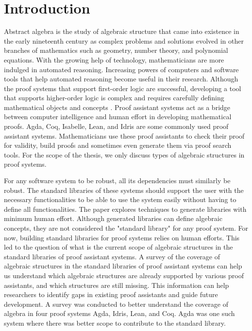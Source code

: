 \chapter{Introduction}
Abstract algebra is the study of algebraic structure that came into existence in
the early nineteenth century as complex problems and solutions evolved in other
branches of mathematics such as geometry, number theory, and polynomial
equations. With the growing help of technology, mathematicians are more indulged
in automated reasoning. Increasing powers of computers and software tools that
help automated reasoning become useful in their research. Although the
proof systems that support first-order logic are successful, developing a tool
that supports higher-order logic is complex and requires carefully defining
mathematical objects and concepts \cite{phillips2010automated}. Proof assistant
systems act as a bridge between computer intelligence and human effort in
developing mathematical proofs. Agda, Coq, Isabelle, Lean, and Idris are some
commonly used proof assistant systems. Mathematicians use these proof assistants
to check their proof for validity, build proofs and sometimes even generate them
via proof search tools. For the scope of the thesis, we only discuss types of
algebraic structures in proof systems.

For any software system to be robust, all its dependencies must similarly be
robust. The standard libraries of these systems should support the user with the
necessary functionalities to be able to use the system easily without having to
define all functionalities. The paper \cite{BuildingDiamond} explores techniques
to generate libraries with minimum human effort. Although generated libraries
can define algebraic concepts, they are not considered the "standard library"
for any proof system. For now, building standard libraries for proof systems
relies on human efforts. This led to the question of what is the current scope
of algebraic structures in the standard libraries of proof assistant systems. A
survey of the coverage of algebraic structures in the standard libraries of
proof assistant systems can help us understand which algebraic structures are
already supported by various proof assistants, and which structures are still
missing. This information can help researchers to identify gaps in existing
proof assistants and guide future development. A survey was conducted to better
understand the coverage of algebra in four proof systems Agda, Idris, Lean, and
Coq. Agda was one such system where there was better scope to contribute to the
standard library.

